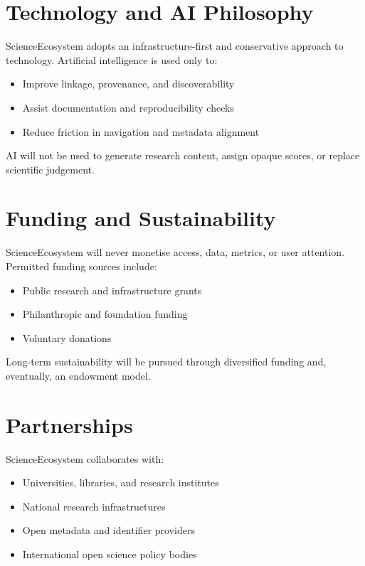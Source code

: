 \documentclass[11pt,a4paper]{article}
\begin{document}
\section{Technology and AI Philosophy}

ScienceEcosystem adopts an infrastructure-first and conservative approach to technology. Artificial intelligence is used only to:
\begin{itemize}
    \item Improve linkage, provenance, and discoverability
    \item Assist documentation and reproducibility checks
    \item Reduce friction in navigation and metadata alignment
\end{itemize}

AI will not be used to generate research content, assign opaque scores, or replace scientific judgement.

\section{Funding and Sustainability}

ScienceEcosystem will never monetise access, data, metrics, or user attention. Permitted funding sources include:
\begin{itemize}
    \item Public research and infrastructure grants
    \item Philanthropic and foundation funding
    \item Voluntary donations
\end{itemize}

Long-term sustainability will be pursued through diversified funding and, eventually, an endowment model.

\section{Partnerships}

ScienceEcosystem collaborates with:
\begin{itemize}
    \item Universities, libraries, and research institutes
    \item National research infrastructures
    \item Open metadata and identifier providers
    \item International open science policy bodies
\end{itemize}
\end{document}
